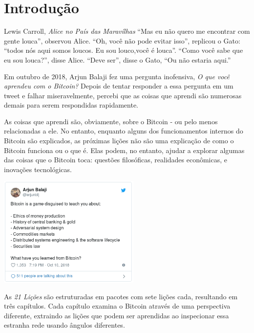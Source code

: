 \chapter*{Introdução}
\label{ch:introduction}

\begin{chapquote}{Lewis Carroll, \textit{Alice no País das Maravílhas}}
\enquote{Mas eu não quero me encontrar com gente louca}, observou Alice. \enquote{Oh, você não pode evitar isso}, replicou o Gato: \enquote{todos nós aqui somos loucos. Eu sou louco,você é louca}. \enquote{Como você sabe que eu sou louca?}, disse Alice. \enquote{Deve ser}, disse o Gato, \enquote{Ou não estaria aqui.}
\end{chapquote}

Em outubro de 2018, Arjun Balaji fez uma pergunta inofensiva, \textit {O que você aprendeu com o Bitcoin?} Depois de tentar responder a essa pergunta em um tweet e falhar miseravelmente, percebi que as coisas que aprendi são numerosas demais para serem respondidas rapidamente.

As coisas que aprendi são, obviamente, sobre o Bitcoin - ou pelo menos relacionadas a ele. No entanto, enquanto alguns dos funcionamentos internos do Bitcoin são explicados, as próximas lições não são uma explicação de como o Bitcoin funciona ou o que é. Elas podem, no entanto, ajudar a explorar algumas das coisas que o Bitcoin toca: questões filosóficas, realidades econômicas, e inovações tecnológicas.

\begin{center}
  \includegraphics[width=7cm]{assets/images/the-tweet.png}
\end{center}

As \textit {21 Lições} são estruturadas em pacotes com sete lições cada, resultando em três capítulos. Cada capítulo examina o Bitcoin através de uma perspectiva diferente, extraindo as lições que podem ser aprendidas ao inspecionar essa estranha rede usando ângulos diferentes.

